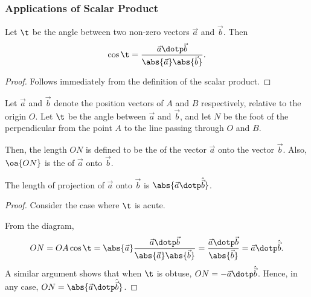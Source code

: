 \subsubsection{Applications of Scalar Product}

\begin{proposition}
    Let $\t$ be the angle between two non-zero vectors $\vec a$ and $\vec b$. Then \[\cos \t = \frac{\vec a \dotp \vec b}{\abs{\vec a} \abs{\vec b}}.\]
\end{proposition}
\begin{proof}
    Follows immediately from the definition of the scalar product.
\end{proof}

\begin{definition}
    Let $\vec a$ and $\vec b$ denote the position vectors of $A$ and $B$ respectively, relative to the origin $O$. Let $\t$ be the angle between $\vec a$ and $\vec b$, and let $N$ be the foot of the perpendicular from the point $A$ to the line passing through $O$ and $B$.

    Then, the length $ON$ is defined to be the  of the vector $\vec a$ onto the vector $\vec b$. Also, $\oa{ON}$ is the  of $\vec a$ onto $\vec b$.
\end{definition}

\begin{proposition}
    The length of projection of $\vec a$ onto $\vec b$ is $\abs{\vec a \dotp \hat{\vec b}}$.
\end{proposition}
\begin{proof}
    Consider the case where $\t$ is acute.

    \begin{center}
    \end{center}

    From the diagram, \[ON = OA \cos \t = \abs{\vec a} \frac{\vec a \dotp \vec b}{\abs{\vec a} \abs{\vec b}} = \frac{\vec a \dotp \vec b}{\abs{\vec b}} = \vec a \dotp \hat{\vec b}.\] A similar argument shows that when $\t$ is obtuse, $ON = -\vec a \dotp \hat{\vec b}$. Hence, in any case, $ON = \abs{\vec a \dotp \hat{\vec b}}$.
\end{proof}


